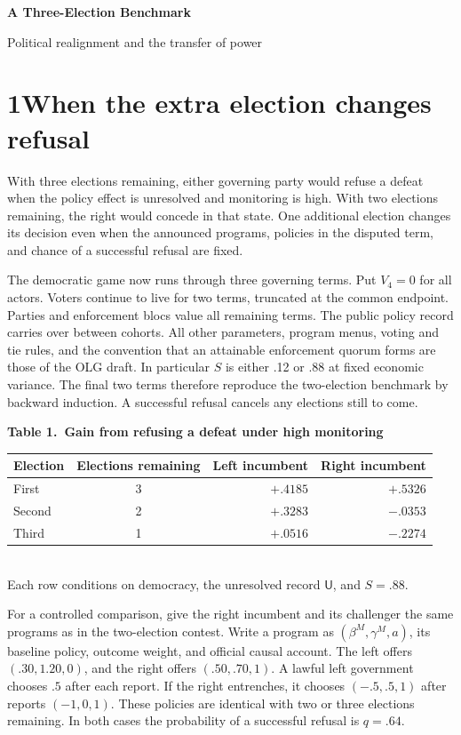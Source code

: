 \documentclass[11pt,letterpaper]{article}
\newcommand{\UU}{\mathsf U}
\begin{document}
\thispagestyle{plain}
{\LARGE\bfseries A Three-Election Benchmark\par}
{\large Political realignment and the transfer of power\par}
\section*{1\quad When the extra election changes refusal}
With three elections remaining, either governing party would refuse a defeat when the policy effect is unresolved and monitoring is high. With two elections remaining, the right would concede in that state. One additional election changes its decision even when the announced programs, policies in the disputed term, and chance of a successful refusal are fixed.

The democratic game now runs through three governing terms. Put \(V_4=0\) for all actors. Voters continue to live for two terms, truncated at the common endpoint. Parties and enforcement blocs value all remaining terms. The public policy record carries over between cohorts. All other parameters, program menus, voting and tie rules, and the convention that an attainable enforcement quorum forms are those of the OLG draft. In particular \(S\) is either .12 or .88 at fixed economic variance. The final two terms therefore reproduce the two-election benchmark by backward induction. A successful refusal cancels any elections still to come.

\begin{center}\small
\textbf{Table 1.\ Gain from refusing a defeat under high monitoring}\\[5pt]
\begin{tabular}{@{}lcrr@{}}\toprule
Election & Elections remaining & Left incumbent & Right incumbent\\\midrule
First  & 3 & $+.4185$ & $+.5326$\\
Second & 2 & $+.3283$ & $-.0353$\\
Third  & 1 & $+.0516$ & $-.2274$\\\bottomrule
\end{tabular}\\[3pt]
Each row conditions on democracy, the unresolved record \(\UU\), and \(S=.88\).
\end{center}

For a controlled comparison, give the right incumbent and its challenger the same programs as in the two-election contest. Write a program as \((\beta^M,\gamma^M,a)\), its baseline policy, outcome weight, and official causal account. The left offers \((.30,1.20,0)\), and the right offers \((.50,.70,1)\). A lawful left government chooses \(.5\) after each report. If the right entrenches, it chooses \((-.5,.5,1)\) after reports \((-1,0,1)\). These policies are identical with two or three elections remaining. In both cases the probability of a successful refusal is \(q=.64\).
\end{document}
